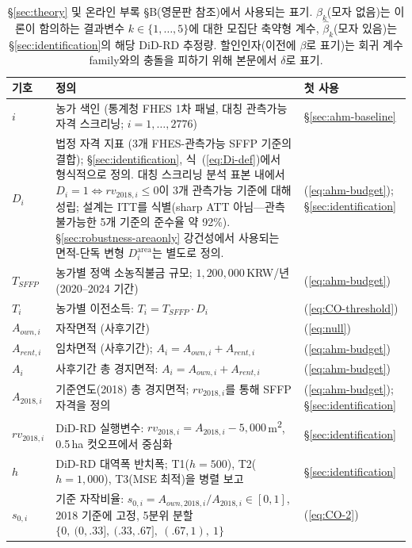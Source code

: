 \documentclass[12pt, a4paper]{article}
\begin{document}
\begin{table}[ht]
\centering
\caption{\S\ref{sec:theory} 및 온라인 부록 \S B(영문판 참조)에서 사용되는 표기. $\beta_k$(모자 없음)는 이론이 함의하는 결과변수 $k \in \{1,\ldots,5\}$에 대한 모집단 축약형 계수, $\hat\beta_k$(모자 있음)는 \S\ref{sec:identification}의 해당 DiD-RD 추정량. 할인인자(이전에 $\beta$로 표기)는 회귀 계수 family와의 충돌을 피하기 위해 본문에서 $\delta$로 표기.}
\label{tab:notation}
\small
\begin{tabular}{p{2.3cm} p{8.8cm} p{2.6cm}}
\toprule
기호 & 정의 & 첫 사용 \\
\midrule
$i$ & 농가 색인 (통계청 FHES 1차 패널, 대칭 관측가능 자격 스크리닝; $i = 1,\ldots,2776$) & \S\ref{sec:ahm-baseline} \\
$D_i$ & 법정 자격 지표 (3개 FHES-관측가능 SFFP 기준의 결합); \S\ref{sec:identification}, 식~(\ref{eq:Di-def})에서 형식적으로 정의. 대칭 스크리닝 분석 표본 내에서 $D_i = 1 \iff rv_{2018,i} \le 0$이 3개 관측가능 기준에 대해 성립; 설계는 ITT를 식별(sharp ATT 아님---관측 불가능한 5개 기준의 준수율 약 92\%). \S\ref{sec:robustness-areaonly} 강건성에서 사용되는 면적-단독 변형 $D^{\text{area}}_i$는 별도로 정의. & (\ref{eq:ahm-budget}); \S\ref{sec:identification} \\
$T_{SFFP}$ & 농가별 정액 소농직불금 규모; $1{,}200{,}000$\,KRW/년 (2020--2024 기간) & (\ref{eq:ahm-budget}) \\
$T_i$ & 농가별 이전소득: $T_i = T_{SFFP} \cdot D_i$ & (\ref{eq:CO-threshold}) \\
$A_{own,i}$ & 자작면적 (사후기간) & (\ref{eq:null}) \\
$A_{rent,i}$ & 임차면적 (사후기간); $A_i = A_{own,i} + A_{rent,i}$ & (\ref{eq:ahm-budget}) \\
$A_i$ & 사후기간 총 경지면적: $A_i = A_{own,i} + A_{rent,i}$ & (\ref{eq:ahm-budget}) \\
$A_{2018,i}$ & 기준연도(2018) 총 경지면적; $rv_{2018,i}$를 통해 SFFP 자격을 정의 & (\ref{eq:ahm-budget}); \S\ref{sec:identification} \\
$rv_{2018,i}$ & DiD-RD 실행변수: $rv_{2018,i} = A_{2018,i} - 5{,}000$\,m\textsuperscript{2}, 0.5\,ha 컷오프에서 중심화 & \S\ref{sec:identification} \\
$h$ & DiD-RD 대역폭 반치폭; T1($h\!=\!500$), T2($h\!=\!1{,}000$), T3(MSE 최적)을 병렬 보고 & \S\ref{sec:identification} \\
$s_{0,i}$ & 기준 자작비율: $s_{0,i} = A_{own,2018,i}/A_{2018,i} \in [0,1]$, 2018 기준에 고정, 5분위 분할 $\{0,\ (0,.33],\ (.33,.67],\ (.67,1),\ 1\}$ & (\ref{eq:CO-2}) \\

\end{tabular}
\end{table}
\end{document}
